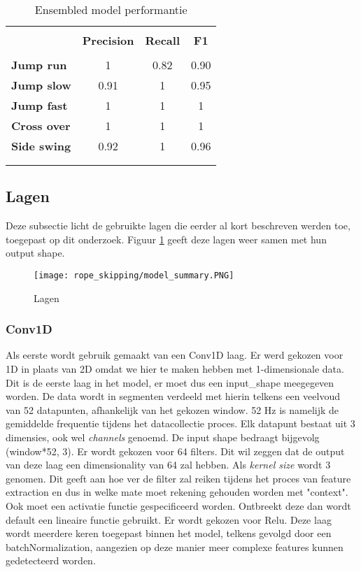 \begin{table}[!htpd]
  \centering
  \caption{Ensembled model performantie}
  \label{tab:ensemble}
\begin{tabular}{lccc}
 \hline \\
\textbf{}             & \textbf{Precision}  & \textbf{Recall}   & \textbf{F1} &  \\
\hline \\
\textbf{Jump run}     & 1                   & 0.82              & 0.90       &  \\
\textbf{Jump slow}    & 0.91                & 1                 & 0.95       &  \\
\textbf{Jump fast}    & 1                   & 1                 & 1       &  \\
\textbf{Cross over}   & 1                   & 1                 & 1        &  \\
\textbf{Side swing}   & 0.92                & 1                 & 0.96       & \\\\
\hline \\
\end{tabular}
\end{table}

\subsection{Lagen}
Deze subsectie licht de gebruikte lagen die eerder al kort beschreven werden toe, toegepast op dit onderzoek. Figuur \ref{fig:lagen} geeft deze lagen weer samen met hun output shape.

\begin{figure}[!htpd]
\centering
\caption{Lagen}\label{fig:lagen}
\texttt{[image: rope\_skipping/model\_summary.PNG]} 
\end{figure}

\subsubsection{Conv1D}
Als eerste wordt gebruik gemaakt van een Conv1D laag. Er werd gekozen voor 1D in plaats van 2D omdat we hier te maken hebben met 1-dimensionale data. Dit is de eerste laag in het model, er moet dus een input\_shape meegegeven worden. De data wordt in segmenten verdeeld met hierin telkens een veelvoud van 52 datapunten, afhankelijk van het gekozen window. 52 Hz is namelijk de gemiddelde frequentie tijdens het datacollectie proces. Elk datapunt bestaat uit 3 dimensies, ook wel \textit{channels} genoemd. De input shape bedraagt bijgevolg (window*52, 3). Er wordt gekozen voor 64 filters. Dit wil zeggen dat de output van deze laag een dimensionality van 64 zal hebben. Als \textit{kernel size} wordt 3 genomen. Dit geeft aan hoe ver de filter zal reiken tijdens het proces van feature extraction en dus in welke mate moet rekening gehouden worden met "context". Ook moet een activatie functie gespecificeerd worden. Ontbreekt deze dan wordt default een lineaire functie gebruikt. Er wordt gekozen voor Relu.
Deze laag wordt meerdere keren toegepast binnen het model, telkens gevolgd door een batchNormalization, aangezien op deze manier meer complexe features kunnen gedetecteerd worden. 

